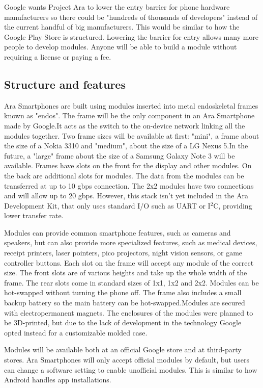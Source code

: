 Google wants Project Ara to lower the entry barrier for phone hardware manufacturers so there could be "hundreds of thousands of developers" instead of the current handful of big manufacturers. This would be similar to how the Google Play Store is structured. Lowering the barrier for entry allows many more people to develop modules. Anyone will be able to build a module without requiring a license or paying a fee.

\subsection{Structure and features}

Ara Smartphones are built using modules inserted into metal endoskeletal frames known as "endos". The frame will be the only component in an Ara Smartphone made by Google.It acts as the switch to the on-device network linking all the modules together. Two frame sizes will be available at first: "mini", a frame about the size of a Nokia 3310 and "medium", about the size of a LG Nexus 5.In the future, a "large" frame about the size of a Samsung Galaxy Note 3 will be available. Frames have slots on the front for the display and other modules. On the back are additional slots for modules. The data from the modules can be transferred at up to 10 gbps connection. The 2x2 modules have two connections and will allow up to 20 gbps. However, this stack isn't yet included in the Ara Development Kit, that only uses standard I/O such as UART or I$^2$C, providing lower transfer rate.

Modules can provide common smartphone features, such as cameras and speakers, but can also provide more specialized features, such as medical devices, receipt printers, laser pointers, pico projectors, night vision sensors, or game controller buttons. Each slot on the frame will accept any module of the correct size. The front slots are of various heights and take up the whole width of the frame. The rear slots come in standard sizes of 1x1, 1x2 and 2x2. Modules can be hot-swapped without turning the phone off. The frame also includes a small backup battery so the main battery can be hot-swapped.Modules are secured with electropermanent magnets. The enclosures of the modules were planned to be 3D-printed, but due to the lack of development in the technology Google opted instead for a customizable molded case.

Modules will be available both at an official Google store and at third-party stores. Ara Smartphones will only accept official modules by default, but users can change a software setting to enable unofficial modules. This is similar to how Android handles app installations.

